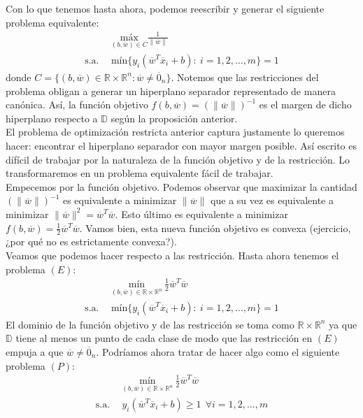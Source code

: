 \documentclass[11pt]{article}
\newcommand{\R}{\mathbb{R}}
\newcommand{\Rn}{\R^{n}}
\newcommand{\Rnu}{\R\times\Rn}
\newcommand{\wv}{\overline{w}}
\newcommand{\x}{\overline{x}}
\newcommand{\z}{\overline{0}_{n}}
\newcommand{\Sm}{1,2,\ldots, m}
\newcommand{\Dat}{\mathbb{D}}
\newcommand{\nw}{\|\wv\|}
\begin{document}
Con lo que tenemos hasta ahora, podemos reescribir y generar el siguiente problema equivalente:
\begin{equation*}
\begin{aligned}
& \underset{(b,\wv)\in C}{\text{máx}} \frac{1}{\nw} \\
\text{s.a.}\ \
& \text{mín}\{y_{i}(\wv^{T}\x_{i}+b):\ i=\Sm \}=1
\end{aligned}
\end{equation*}
donde $C=\{(b,\wv)\in\Rnu: \wv\ne\z\}$. Notemos que las restricciones del problema obligan a generar un hiperplano separador  representado de manera canónica. Así, la función objetivo $f(b, \wv)=(\nw)^{-1}$ es el margen de dicho hiperplano respecto a $\Dat$ según la proposición anterior.\\

El problema de optimización restricta anterior captura justamente lo queremos hacer: encontrar el hiperplano separador con mayor margen posible. Así escrito es dífícil de trabajar por la naturaleza de la función objetivo y de la restricción. Lo transformaremos en un problema equivalente fácil de trabajar.\\

Empecemos por la función objetivo. Podemos observar que maximizar la cantidad $(\nw)^{-1}$ es equivalente a minimizar $\nw$ que a su vez es equivalente a minimizar $\nw^{2}=\wv^{T}\wv$. Esto último es equivalente a minimizar $f(b, \wv)=\frac{1}{2}\wv^{T}\wv$. Vamos bien, esta nueva función objetivo es convexa (ejercicio, ¿por qué no es estrictamente convexa?).\\

Veamos que podemos hacer respecto a las restricción. Hasta ahora tenemos el problema $(E)$:
\begin{equation*}
\begin{aligned}
& \underset{(b,\wv)\in \Rnu}{\text{mín}}\ \frac{1}{2}\wv^{T}\wv \\
\text{s.a.}\ \
& \text{mín}\{y_{i}(\wv^{T}\x_{i}+b):\ i=\Sm \}=1
\end{aligned}
\end{equation*}
El dominio de la función objetivo y de las restricción se toma como $\Rnu$ ya que $\Dat$ tiene al menos un punto de cada clase de modo que las restricción en $(E)$ empuja a que $\wv\ne\z$. Podríamos ahora tratar de hacer algo como el siguiente problema $(P)$:
\begin{equation*}
\begin{aligned}
& \underset{(b,\wv)\in \Rnu}{\text{mín}}\ \frac{1}{2}\wv^{T}\wv \\
\text{s.a.}\ \
& y_{i}(\wv^{T}\x_{i}+b)\geq1\ \ \forall i=\Sm
\end{aligned}
\end{equation*}
\end{document}
